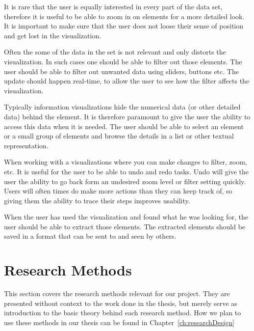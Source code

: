 It is rare that the user is equally interested in every part of the data set, therefore it is useful to be able to zoom in on elements for a more detailed look. It is important to make sure that the user does not loose their sense of position and get lost in the visualization.

Often the some of the data in the set is not relevant and only distorts the visualization. In such cases one should be able to filter out those elements. The user should be able to filter out unwanted data using sliders, buttons etc. The update should happen real-time, to allow the user to see how the filter affects the visualization. 

Typically information visualizations hide the numerical data (or other detailed data) behind the element. It is therefore paramount to give the user the ability to access this data when it is needed. The user should be able to select an element or a small group of elements and browse the details in a list or other textual representation.

When working with a visualizations where you can make changes to filter, zoom, etc. It is useful for the user to be able to undo and redo tasks. Undo will give the user the ability to go back form an undesired zoom level or filter setting quickly. Users will often times do make more actions than they can keep track of, so giving them the ability to trace their steps improves usability.

When the user has used the visualization and found what he was looking for, the user should be able to extract those elements. The extracted elements should be saved in a format that can be sent to and seen by others. 

\section{Research Methods}
This section covers the research methods relevant for our project. They are presented without context to the work done in the thesis, but merely serve as introduction to the basic theory behind each research method. How we plan to use these methods in our thesis can be found in Chapter~\ref{ch:researchDesign}


